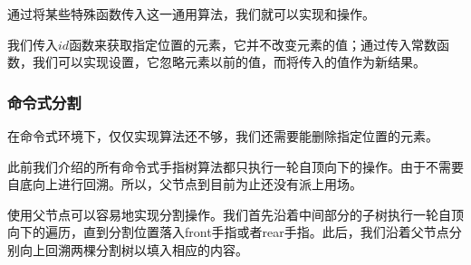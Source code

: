 \documentclass[b5paper]{ctexart}
\begin{document}
通过将某些特殊函数传入这一通用算法，我们就可以实现和操作。

\begin{algorithmic}
  \State \Return {}
\EndFunction
\Statex
{}
  \State \Return {}
\EndFunction
\end{algorithmic}

我们传入$id$函数来获取指定位置的元素，它并不改变元素的值；通过传入常数函数，我们可以实现设置，它忽略元素以前的值，而将传入的值作为新结果。

\subsubsection{命令式分割}

在命令式环境下，仅仅实现算法还不够，我们还需要能删除指定位置的元素。

此前我们介绍的所有命令式手指树算法都只执行一轮自顶向下的操作。由于不需要自底向上进行回溯。所以，父节点到目前为止还没有派上用场。

使用父节点可以容易地实现分割操作。我们首先沿着中间部分的子树执行一轮自顶向下的遍历，直到分割位置落入front手指或者rear手指。此后，我们沿着父节点分别向上回溯两棵分割树以填入相应的内容。
\end{document}
